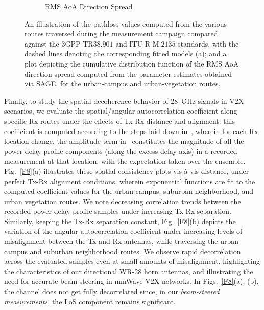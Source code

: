 \documentclass[12pt, draftcls, onecolumn]{IEEEtran}
\begin{document}
\begin{figure} [t]
\begin{subfigure}{0.505\linewidth}
         \caption{RMS AoA Direction Spread}
         \label{F7b}
     \end{subfigure}
     \vspace{-2mm}
     \caption{An illustration of the pathloss values computed from the various routes traversed during the measurement campaign compared against the $3$GPP TR$38.901$ and ITU-R M.$2135$ standards, with the dashed lines denoting the corresponding fitted models (a); and a plot depicting the cumulative distribution function of the RMS AoA direction-spread computed from the parameter estimates obtained via SAGE, for the urban-campus and urban-vegetation routes.}
     \label{F7}
\end{figure}

Finally, to study the spatial decoherence behavior of \SI{28}{\giga\hertz} signals in V$2$X scenarios, we evaluate the spatial/angular autocorrelation coefficient along specific Rx routes under the effects of Tx-Rx distance and alignment: this coefficient is computed according to the steps laid down in~\cite{MacCartneySpatialStatistics}, wherein for each Rx location change, the amplitude term in~\cite{MacCartneySpatialStatistics} constitutes the magnitude of all the power-delay profile components (along the excess delay axis) in a recorded measurement at that location, with the expectation taken over the ensemble. Fig.~\ref{F8}(a) illustrates these spatial consistency plots vis-\`{a}-vis distance, under perfect Tx-Rx alignment conditions, wherein exponential functions are fit to the computed coefficient values for the urban campus, suburban neighborhood, and urban vegetation routes. We note decreasing correlation trends between the recorded power-delay profile samples under increasing Tx-Rx separation. Similarly, keeping the Tx-Rx separation constant, Fig.~\ref{F8}(b) depicts the variation of the angular autocorrelation coefficient under increasing levels of misalignment between the Tx and Rx antennas, while traversing the urban campus and suburban neighborhood routes. We observe rapid decorrelation across the evaluated samples even at small amounts of misalignment, highlighting the characteristics of our directional WR-$28$ horn antennas, and illustrating the need for accurate beam-steering in mmWave V$2$X networks. In Figs.~\ref{F8}(a), (b), the channel does not get fully decorrelated since, in our \emph{beam-steered measurements}, the LoS component remains significant.
\end{document}
